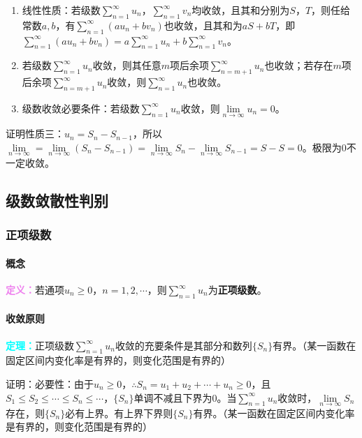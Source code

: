 \documentclass[UTF8, 12pt]{ctexart}
\begin{document}
\begin{enumerate}
    \item 线性性质：若级数$\sum\limits_{n=1}^\infty u_n$，$\sum\limits_{n=1}^\infty v_n$均收敛，且其和分别为$S$，$T$，则任给常数$a,b$，有$\sum\limits_{n=1}^\infty(au_n+bv_n)$也收敛，且其和为$aS+bT$，即$\sum\limits_{n=1}^\infty(au_n+bv_n)=a\sum\limits_{n=1}^\infty u_n+b\sum\limits_{n=1}^\infty v_n$。
    \item 若级数$\sum\limits_{n=1}^\infty u_n$收敛，则其任意$m$项后余项$\sum\limits_{n=m+1}^\infty u_n$也收敛；若存在$m$项后余项$\sum\limits_{n=m+1}^\infty u_n$收敛，则$\sum\limits_{n=1}^\infty u_n$也收敛。
    \item 级数收敛必要条件：若级数$\sum\limits_{n=1}^\infty u_n$收敛，则$\lim\limits_{n\to\infty}u_n=0$。
\end{enumerate}

证明性质三：$u_n=S_n-S_{n-1}$，所以$\lim\limits_{n\to\infty}=\lim\limits_{n\to\infty}(S_n-S_{n-1})=\lim\limits_{n\to\infty}S_n-\lim\limits_{n\to\infty}S_{n-1}=S-S=0$。极限为0不一定收敛。

\subsection{级数敛散性判别}

\subsubsection{正项级数}

\paragraph{概念} \leavevmode \medskip

\textcolor{violet}{\textbf{定义：}}若通项$u_n\geqslant0$，$n=1,2,\cdots$，则$\sum\limits_{n=1}^\infty u_n$为\textbf{正项级数}。

\paragraph{收敛原则} \leavevmode \medskip

\textcolor{aqua}{\textbf{定理：}}正项级数$\sum\limits_{n=1}^\infty u_n$收敛的充要条件是其部分和数列$\{S_n\}$有界。（某一函数在固定区间内变化率是有界的，则变化范围是有界的）

证明：必要性：由于$u_n\geqslant0$，$\therefore S_n=u_1+u_2+\cdots+u_n\geqslant0$，且$S_1\leqslant S_2\leqslant\cdots\leqslant S_n\leqslant\cdots$，$\{S_n\}$单调不减且下界为0。当$\sum\limits_{n=1}^\infty u_n$收敛时，$\lim\limits_{n\to\infty}S_n$存在，则$\{S_n\}$必有上界。有上界下界则$\{S_n\}$有界。（某一函数在固定区间内变化率是有界的，则变化范围是有界的）
\end{document}

